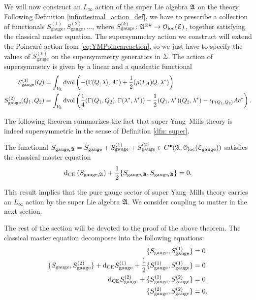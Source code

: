 \documentclass[10pt, oneside]{article}
\newcommand{\gauge}{\mathrm{gauge}}
\begin{document}
We will now construct an $L_\infty$ action of the super Lie algebra $\mathfrak{A}$ on the theory. Following Definition \ref{infinitesimal_action_def}, we have to prescribe a collection of functionals $S_{\gauge}^{(1)}, S_{\gauge}^{(2)}, \dots$, where $S_{\gauge}^{(k)}\colon \mf{A}^{\otimes k}\rightarrow \oloc(\cE)$, together satisfying the classical master equation. The supersymmetry action we construct will extend the Poincar\'{e} action from \eqref{eq:YMPoincareaction}, so we just have to specify the values of $S_{\gauge}^{(k)}$ on the supersymmetry generators in $\Sigma$. The action of supersymmetry is given by a linear and a quadratic functional
\begin{align}
S_{\gauge}^{(1)}(Q) &= \int_{V_\RR}\dvol\left( -(\Gamma(Q, \lambda), A^*) + \frac{1}{2}(\rho(F_A)Q, \lambda^*)\right) \label{eq:gaugeI1} \\
S_{\gauge}^{(2)}(Q_1, Q_2) &= \int_{V_\RR}\dvol\left( \frac{1}{4}(\Gamma(Q_1, Q_2), \Gamma(\lambda^*, \lambda^*)) - \frac{1}{2}(Q_1, \lambda^*)(Q_2, \lambda^*) - \iota_{\Gamma(Q_1, Q_2)} A c^*\right). \label{eq:gaugeI2}
\end{align}

The following theorem summarizes the fact that super Yang--Mills theory is indeed supersymmetric in the sense of Definition \ref{dfn: super}. 

\begin{theorem}\label{thm:gaugemultipletSUSY}
The functional $S_{\gauge, \fA} = S_{\gauge} + S_{\gauge}^{(1)} + S_{\gauge}^{(2)} \in C^\bu(\mf{A}, \oloc(\cE_{\gauge}))$ satisfies the classical master equation
\[\d_{\mr{CE}} \left(S_{\gauge, \fA}\right) + \frac{1}{2}\{S_{\gauge, \fA}, S_{\gauge, \fA}\} = 0.\]
\end{theorem}

This result implies that the pure gauge sector of super Yang--Mills theory carries an $L_\infty$ action by the super Lie algebra $\mathfrak A$.
We consider coupling to matter in the next section.

The rest of the section will be devoted to the proof of the above theorem. The classical master equation decomposes into the following equations:
\begin{align*}
\{S_{\gauge}, S_{\gauge}^{(1)}\} &= 0 \\
\{S_{\gauge}, S_{\gauge}^{(2)}\} + \d_{\mr{CE}} S_{\gauge}^{(1)} + \frac{1}{2}\{S_{\gauge}^{(1)}, S_{\gauge}^{(1)}\} &= 0 \\
\d_{\mr{CE}} S_{\gauge}^{(2)} + \{S_{\gauge}^{(1)}, S_{\gauge}^{(2)}\} &= 0 \\
\{S_{\gauge}^{(2)}, S_{\gauge}^{(2)}\} &= 0.
\end{align*}
\end{document}
